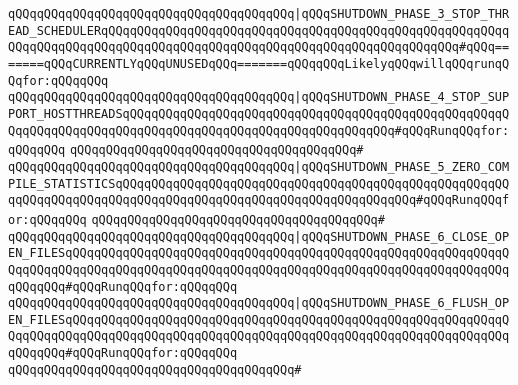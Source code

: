 \verb|qQQqqQQqqQQqqQQqqQQqqQQqqQQqqQQqqQQqqQQq|\verb#|qQQqSHUTDOWN_PHASE_3_STOP_THREAD_SCHEDULERqQQqqQQqqQQqqQQqqQQqqQQqqQQqqQQqqQQqqQQqqQQqqQQqqQQqqQQqqQQqqQQqqQQqqQQqqQQqqQQqqQQqqQQqqQQqqQQqqQQqqQQqqQQqqQQqqQQqqQQq#\verb|#qQQq=======qQQqCURRENTLYqQQqUNUSEDqQQq=======qQQqqQQqLikelyqQQqwillqQQqrunqQQqfor:qQQqqQQq|\newline
\verb|qQQqqQQqqQQqqQQqqQQqqQQqqQQqqQQqqQQqqQQq|\verb#|qQQqSHUTDOWN_PHASE_4_STOP_SUPPORT_HOSTTHREADSqQQqqQQqqQQqqQQqqQQqqQQqqQQqqQQqqQQqqQQqqQQqqQQqqQQqqQQqqQQqqQQqqQQqqQQqqQQqqQQqqQQqqQQqqQQqqQQqqQQqqQQqqQQq#\verb|#qQQqRunqQQqfor:qQQqqQQq|\newline
\verb|qQQqqQQqqQQqqQQqqQQqqQQqqQQqqQQqqQQqqQQq#|\newline
\verb|qQQqqQQqqQQqqQQqqQQqqQQqqQQqqQQqqQQqqQQq|\verb#|qQQqSHUTDOWN_PHASE_5_ZERO_COMPILE_STATISTICSqQQqqQQqqQQqqQQqqQQqqQQqqQQqqQQqqQQqqQQqqQQqqQQqqQQqqQQqqQQqqQQqqQQqqQQqqQQqqQQqqQQqqQQqqQQqqQQqqQQqqQQqqQQqqQQq#\verb|#qQQqRunqQQqfor:qQQqqQQq|\newline
\verb|qQQqqQQqqQQqqQQqqQQqqQQqqQQqqQQqqQQqqQQq#|\newline
\verb|qQQqqQQqqQQqqQQqqQQqqQQqqQQqqQQqqQQqqQQq|\verb#|qQQqSHUTDOWN_PHASE_6_CLOSE_OPEN_FILESqQQqqQQqqQQqqQQqqQQqqQQqqQQqqQQqqQQqqQQqqQQqqQQqqQQqqQQqqQQqqQQqqQQqqQQqqQQqqQQqqQQqqQQqqQQqqQQqqQQqqQQqqQQqqQQqqQQqqQQqqQQqqQQqqQQqqQQqqQQq#\verb|#qQQqRunqQQqfor:qQQqqQQq|\newline
\verb|qQQqqQQqqQQqqQQqqQQqqQQqqQQqqQQqqQQqqQQq|\verb#|qQQqSHUTDOWN_PHASE_6_FLUSH_OPEN_FILESqQQqqQQqqQQqqQQqqQQqqQQqqQQqqQQqqQQqqQQqqQQqqQQqqQQqqQQqqQQqqQQqqQQqqQQqqQQqqQQqqQQqqQQqqQQqqQQqqQQqqQQqqQQqqQQqqQQqqQQqqQQqqQQqqQQqqQQqqQQq#\verb|#qQQqRunqQQqfor:qQQqqQQq|\newline
\verb|qQQqqQQqqQQqqQQqqQQqqQQqqQQqqQQqqQQqqQQq#|\newline
